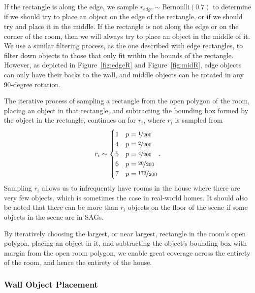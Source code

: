 If the rectangle is along the edge, we sample $r_{\textit{edge}} \sim \text{Bernoulli}(0.7)$ to determine if we should try to place an object on the edge of the rectangle, or if we should try and place it in the middle. If the rectangle is not along the edge or on the corner of the room, then we will always try to place an object in the middle of it. We use a similar filtering process, as the one described with edge rectangles, to filter down objects to those that only fit within the bounds of the rectangle. However, as depicted in Figure~\ref{fig:edgeR} and Figure~\ref{fig:midR}, edge objects can only have their backs to the wall, and middle objects can be rotated in any 90-degree rotation.

The iterative process of sampling a rectangle from the open polygon of the room, placing an object in that rectangle, and subtracting the bounding box formed by the object in the rectangle, continues on for $r_{i}$, where $r_i$ is sampled from
\begin{equation}
    r_i\sim \begin{cases}
        1 & p=\nicefrac{1}{200}\\
        4 & p=\nicefrac{2}{200}\\
        5 & p=\nicefrac{4}{200}\\
        6 & p=\nicefrac{20}{200}\\
        7 & p=\nicefrac{173}{200}
    \end{cases}.
\end{equation}
Sampling $r_i$ allows us to infrequently have rooms in the house where there are very few objects, which is sometimes the case in real-world homes. It should also be noted that there can be more than $r_i$ objects on the floor of the scene if some objects in the scene are in SAGs.

By iteratively choosing the largest, or near largest, rectangle in the room's open polygon, placing an object in it, and subtracting the object's bounding box with margin from the open room polygon, we enable great coverage across the entirety of the room, and hence the entirety of the house.

\subsubsection{Wall Object Placement}

